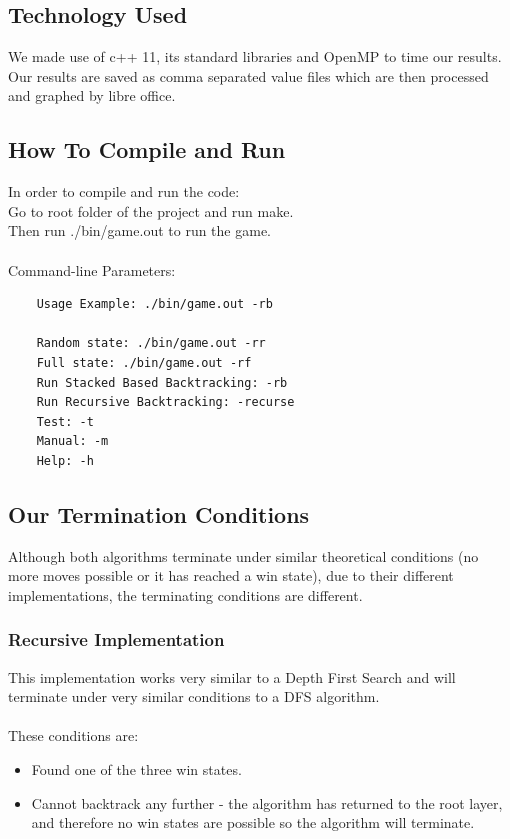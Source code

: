\documentclass[a4paper]{article}
\begin{document}
\subsection{Technology Used}
We made use of c++ 11, its standard libraries and OpenMP to time our results. Our results are saved as comma separated value files which are then processed and graphed by libre office.\\

\subsection{How To Compile and Run}
In order to compile and run the code:\\
Go to root folder of the project and run make.\\
Then run ./bin/game.out to run the game.
\\\\
\noindent Command-line Parameters:
\begin{lstlisting}
	Usage Example: ./bin/game.out -rb
	
	Random state: ./bin/game.out -rr
	Full state: ./bin/game.out -rf
	Run Stacked Based Backtracking: -rb
	Run Recursive Backtracking: -recurse
	Test: -t
	Manual: -m
	Help: -h
\end{lstlisting}

\subsection{Our Termination Conditions}
Although both algorithms terminate under similar theoretical conditions (no more moves possible or it has reached a win state), due to their different implementations, the terminating conditions are different.
\subsubsection{Recursive Implementation}
This implementation works very similar to a Depth First Search and will terminate under very similar conditions to a DFS algorithm.\\
\\
\noindent These conditions are: 
\begin{itemize}
\item Found one of the three win states.
\item Cannot backtrack any further - the algorithm has returned to the root layer, and therefore no win states are possible so the algorithm will terminate.
\end{itemize}
\end{document}
